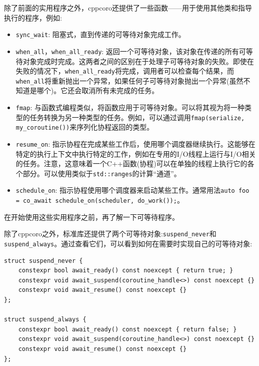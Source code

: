 除了前面的实用程序之外，cppcoro还提供了一些函数——用于使用其他类和指导执行的程序，例如:

\begin{itemize}
\item 
\texttt{sync\_wait}: 阻塞式，直到传递的可等待对象完成工作。

\item
\texttt{when\_all}，\texttt{when\_all\_ready}: 返回一个可等待对象，该对象在传递的所有可等待对象完成时完成。这两者之间的区别在于处理子可等待对象的失败。即使在失败的情况下，\texttt{when\_all\_ready}将完成，调用者可以检查每个结果，而\texttt{when\_all}将重新抛出一个异常，如果任何子可等待对象抛出一个异常(虽然不知道是哪个)。它还会取消所有未完成的任务。

\item
\texttt{fmap}: 与函数式编程类似，将函数应用于可等待对象。可以将其视为将一种类型的任务转换为另一种类型的任务。例如，可以通过调用\texttt{fmap(serialize, my\_coroutine())}来序列化协程返回的类型。

\item
\texttt{resume\_on}: 指示协程在完成某些工作后，使用哪个调度器继续执行。这能够在特定的执行上下文中执行特定的工作，例如在专用的I/O线程上运行与I/O相关的任务。注意，这意味着一个C++函数(协程)可以在单独的线程上执行它的各个部分。可以使用类似于\texttt{std::ranges}的计算“通道”。

\item
\texttt{schedule\_on}: 指示协程使用哪个调度器来启动某些工作。通常用法\texttt{auto foo = co\_await schedule\_on(scheduler, do\_work());}。
\end{itemize}

在开始使用这些实用程序之前，再了解一下可等待程序。


除了cppcoro之外，标准库还提供了两个可等待对象:\texttt{suspend\_never}和\texttt{suspend\_always}。通过查看它们，可以看到如何在需要时实现自己的可等待对象:

\begin{lstlisting}[style=styleCXX]
struct suspend_never {
	constexpr bool await_ready() const noexcept { return true; }
	constexpr void await_suspend(coroutine_handle<>) const noexcept {}
	constexpr void await_resume() const noexcept {}
};

struct suspend_always {
	constexpr bool await_ready() const noexcept { return false; }
	constexpr void await_suspend(coroutine_handle<>) const noexcept {}
	constexpr void await_resume() const noexcept {}
};
\end{lstlisting}

